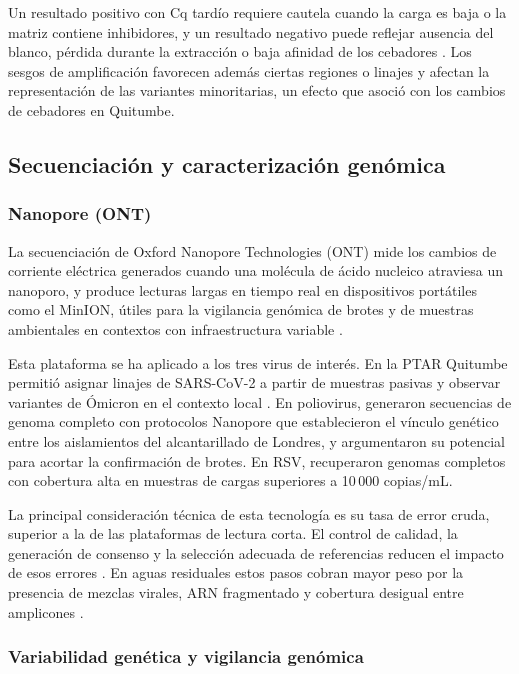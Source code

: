Un resultado positivo con Cq tardío requiere cautela cuando la carga es baja o la matriz contiene inhibidores, y un resultado negativo puede reflejar ausencia del blanco, pérdida durante la extracción o baja afinidad de los cebadores \cite{Child_2023}. Los sesgos de amplificación favorecen además ciertas regiones o linajes y afectan la representación de las variantes minoritarias, un efecto que  asoció con los cambios de cebadores en Quitumbe.

\subsection{Secuenciación y caracterización genómica}

\subsubsection{Nanopore (ONT)}

La secuenciación de Oxford Nanopore Technologies (ONT) mide los cambios de corriente eléctrica generados cuando una molécula de ácido nucleico atraviesa un nanoporo, y produce lecturas largas en tiempo real en dispositivos portátiles como el MinION, útiles para la vigilancia genómica de brotes y de muestras ambientales en contextos con infraestructura variable \cite{Dash_2024}.

Esta plataforma se ha aplicado a los tres virus de interés. En la PTAR Quitumbe permitió asignar linajes de SARS-CoV-2 a partir de muestras pasivas y observar variantes de Ómicron en el contexto local \cite{MejiaCalle_2024}. En poliovirus,  generaron secuencias de genoma completo con protocolos Nanopore que establecieron el vínculo genético entre los aislamientos del alcantarillado de Londres, y  argumentaron su potencial para acortar la confirmación de brotes. En RSV,  recuperaron genomas completos con cobertura alta en muestras de cargas superiores a 10\,000 copias/mL.

La principal consideración técnica de esta tecnología es su tasa de error cruda, superior a la de las plataformas de lectura corta. El control de calidad, la generación de consenso y la selección adecuada de referencias reducen el impacto de esos errores \cite{Dash_2024}. En aguas residuales estos pasos cobran mayor peso por la presencia de mezclas virales, ARN fragmentado y cobertura desigual entre amplicones \cite{Child_2023}.


\subsubsection{Variabilidad genética y vigilancia genómica}

